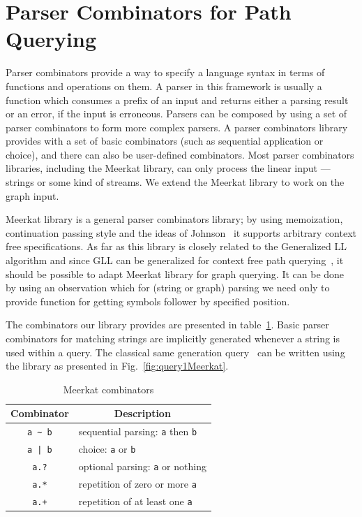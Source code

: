  \section{Parser Combinators for Path Querying}

Parser combinators provide a way to specify a language syntax in terms of functions and operations on them. 
A parser in this framework is usually a function which consumes a prefix of an input and returns either a parsing result or an error, if the input is erroneous. 
Parsers can be composed by using a set of parser combinators to form more complex parsers. 
A parser combinators library provides with a set of basic combinators (such as sequential application or choice), and there can also be user-defined combinators. 
Most parser combinators libraries, including the Meerkat library, can only process the linear input --- strings or some kind of streams. 
We extend the Meerkat library to work on the graph input.

Meerkat library is a general parser combinators library; by using memoization, continuation passing style and the ideas of Johnson~\cite{Johnson} it supports arbitrary context free specifications. 
As far as this library is closely related to the Generalized LL algorithm and since GLL can be generalized for context free path querying~\cite{GrigorevR16}, it should be possible to adapt Meerkat library for graph querying. 
It can be done by using an observation which for (string or graph) parsing we need only to provide function for getting symbols follower by specified position.

The combinators our library provides are presented in table~\ref{table:combinators}. 
Basic parser combinators for matching strings are implicitly generated whenever a string is used within a query. 
The classical same generation query~\cite{FndDB} can be written using the library as presented in Fig.~\ref{fig:query1Meerkat}.

\begin{table}[h]
\centering
\begin{tabular}{c|l}
\multicolumn{1}{c|}{Combinator} & \multicolumn{1}{|c}{Description} \\ \hline
{\lstinline!a ~ b!} & sequential parsing: {\lstinline!a!} then {\lstinline!b!}   \\
{\lstinline!a | b!} & choice: {\lstinline!a!} or {\lstinline!b!}         \\
{\lstinline!a.?!}   & optional parsing: {\lstinline!a!} or nothing   \\
{\lstinline!a.*!}   & repetition of zero or more {\lstinline!a!} \\
{\lstinline!a.+!}   & repetition of at least one {\lstinline!a!} \\
\end{tabular}
\caption{Meerkat combinators}
\label{table:combinators}
\end{table}


